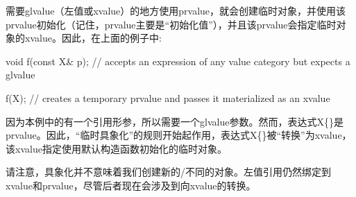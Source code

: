 需要glvalue（左值或xvalue）的地方使用prvalue，就会创建临时对象，并使用该prvalue初始化（记住，prvalue主要是“初始化值”），并且该prvalue会指定临时对象的xvalue。因此，在上面的例子中:

\begin{cppcode}
void f(const X& p); // accepts an expression of any value category but expects a glvalue

f(X{}); // creates a temporary prvalue and passes it materialized as an xvalue
\end{cppcode}

因为本例中的有一个引用形参，所以需要一个glvalue参数。然而，表达式X\{\}是prvalue。因此，“临时具象化”的规则开始起作用，表达式X\{\}被“转换”为xvalue，该xvalue指定使用默认构造函数初始化的临时对象。

请注意，具象化并不意味着我们创建新的/不同的对象。左值引用仍然绑定到xvalue和prvalue，尽管后者现在会涉及到向xvalue的转换。






